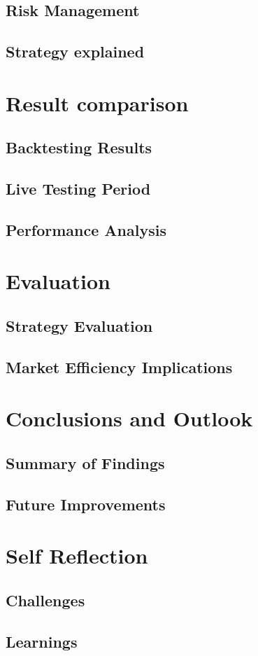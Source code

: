 \documentclass{article}
\begin{document}
\subsection{Risk Management}
\subsection{Strategy explained}

\section{Result comparison}
\subsection{Backtesting Results}
\subsection{Live Testing Period}
\subsection{Performance Analysis}

\section{Evaluation}
\subsection{Strategy Evaluation}
\subsection{Market Efficiency Implications}

\section{Conclusions and Outlook}
\subsection{Summary of Findings}
\subsection{Future Improvements}

\section{Self Reflection}
\subsection{Challenges}
\subsection{Learnings}


\renewcommand{\cftdot}{.}
\renewcommand{\cftdotsep}{2}

\end{document}
